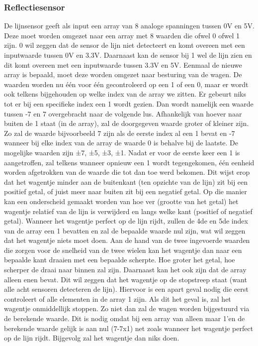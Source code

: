 \documentclass[kulak]{kulakarticle} %
\begin{document}
\subsubsection{Reflectiesensor}
De lijnsensor geeft als input een array van 8 analoge spanningen tussen 0V en 5V. Deze moet worden omgezet naar een array met 8 waarden die ofwel 0 ofwel 1 zijn. 0 wil zeggen dat de sensor de lijn niet detecteert en komt overeen met een inputwaarde tussen 0V en 3.3V. Daarnaast kan de sensor bij 1 wel de lijn zien en dit komt overeen met een inputwaarde tussen 3.3V en 5V. Eenmaal de nieuwe array is bepaald, moet deze worden omgezet naar besturing van de wagen. 
De waarden worden nu één voor één gecontroleerd op een 1 of een 0, maar er wordt ook telkens bijgehouden op welke index van de array we zitten. Er gebeurt niks tot er bij een specifieke index een 1 wordt gezien. Dan wordt namelijk een waarde tussen -7 en 7 overgebracht naar de volgende lus. Afhankelijk van hoever naar buiten de 1 staat (in de array), zal de doorgegeven waarde groter of kleiner zijn. Zo zal de waarde bijvoorbeeld 7 zijn als de eerste index al een 1 bevat en -7 wanneer bij elke index van de array de waarde 0 is behalve bij de laatste. De mogelijke waarden zijn ±7, ±5, ±3, ±1. Nadat er voor de eerste keer een 1 is aangetroffen, zal telkens wanneer opnieuw een 1 wordt tegengekomen, één eenheid worden afgetrokken van de waarde die tot dan toe werd bekomen. Dit wijst erop dat het wagentje minder aan de buitenkant (ten opzichte van de lijn) zit bij een positief getal, of juist meer naar buiten zit bij een negatief getal. Op die manier kan een onderscheid gemaakt worden van hoe ver (grootte van het getal) het wagentje relatief van de lijn is verwijderd en langs welke kant (positief of negatief getal). Wanneer het wagentje perfect op de lijn rijdt, zullen de 4de en 5de index van de array een 1 bevatten en zal de bepaalde waarde nul zijn, wat wil zeggen dat het wagentje niets moet doen. Aan de hand van de twee ingevoerde waarden die zorgen voor de snelheid van de twee wielen kan het wagentje dan naar een bepaalde kant draaien met een bepaalde scherpte. Hoe groter het getal, hoe scherper de draai naar binnen zal zijn.
Daarnaast kan het ook zijn dat de array alleen enen bevat. Dit wil zeggen dat het wagentje op de stopstreep staat (want alle acht sensoren detecteren de lijn). Hiervoor is een apart geval nodig die eerst controleert of alle elementen in de array 1 zijn. Als dit het geval is, zal het wagentje onmiddellijk stoppen. Zo niet dan zal de wagen worden bijgestuurd via de berekende waarde. Dit is nodig omdat bij een array van alleen maar 1’en de berekende waarde gelijk is aan nul (7-7x1) net zoals wanneer het wagentje perfect op de lijn rijdt. Bijgevolg zal het wagentje dan niks doen.
\end{document}
